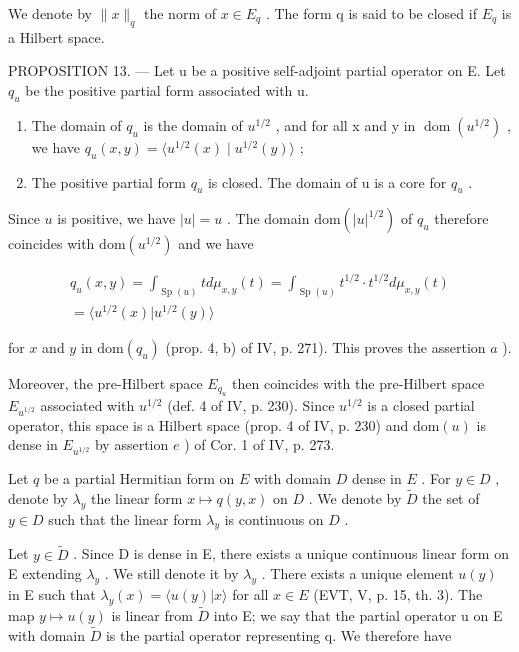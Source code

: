 We denote by \(\|x\|_{q}\) the norm of \(x \in E_{q}\) . The form q is said to be closed if \(E_{q}\) is a Hilbert space.

PROPOSITION 13. --- Let u be a positive self-adjoint partial operator on E. Let \(q_{u}\) be the positive partial form associated with u.

\begin{enumerate}
\def\labelenumi{\alph{enumi})}
\item
  The domain of \(q_{u}\) is the domain of \(u^{1/2}\) , and for all x and y in \(\operatorname{dom}(u^{1/2})\) , we have \(q_{u}(x,y)=\langle u^{1/2}(x)\mid u^{1/2}(y)\rangle\) ;
\item
  The positive partial form \(q_{u}\) is closed. The domain of u is a core for \(q_{u}\) .
\end{enumerate}

Since \(u\) is positive, we have \(|u| = u\) . The domain \(\mathrm{dom}(|u|^{1/2})\) of \(q_u\) therefore coincides with \(\mathrm{dom}(u^{1/2})\) and we have

\[
\begin{array}{c} q _ {u} (x, y) = \int_ {\operatorname{Sp} (u)} t d \mu_ {x, y} (t) = \int_ {\operatorname{Sp} (u)} t ^ {1 / 2} \cdot t ^ {1 / 2} d \mu_ {x, y} (t) \\ = \langle u ^ {1 / 2} (x) | u ^ {1 / 2} (y) \rangle \end{array}
\]

for \(x\) and \(y\) in \(\mathrm{dom}(q_u)\) (prop. 4, b) of IV, p. 271). This proves the assertion \(a\) ).

Moreover, the pre-Hilbert space \(E_{q_{u}}\) then coincides with the pre-Hilbert space \(E_{u^{1/2}}\) associated with \(u^{1/2}\) (def. 4 of IV, p. 230). Since \(u^{1/2}\) is a closed partial operator, this space is a Hilbert space (prop. 4 of IV, p. 230) and \(\text{dom}(u)\) is dense in \(E_{u^{1/2}}\) by assertion \(e\) ) of Cor. 1 of IV, p. 273.

Let \(q\) be a partial Hermitian form on \(E\) with domain \(D\) dense in \(E\) . For \(y \in D\) , denote by \(\lambda_y\) the linear form \(x \mapsto q(y, x)\) on \(D\) . We denote by \(\widetilde{D}\) the set of \(y \in D\) such that the linear form \(\lambda_y\) is continuous on \(D\) .

Let \(y \in \widetilde{D}\) . Since D is dense in E, there exists a unique continuous linear form on E extending \(\lambda_{y}\) . We still denote it by \(\lambda_{y}\) . There exists a unique element \(u(y)\) in E such that \(\lambda_{y}(x) = \langle u(y) | x \rangle\) for all \(x \in E\) (EVT, V, p. 15, th. 3). The map \(y \mapsto u(y)\) is linear from \(\widetilde{D}\) into E; we say that the partial operator u on E with domain \(\widetilde{D}\) is the partial operator representing q. We therefore have

